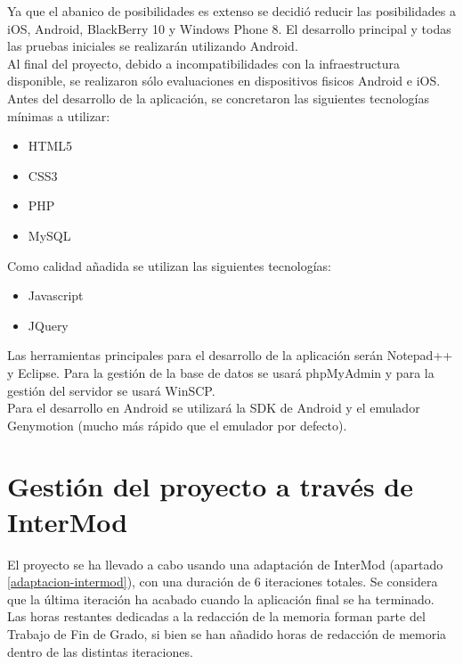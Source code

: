 Ya que el abanico de posibilidades es extenso se decidió reducir las posibilidades a iOS, Android, BlackBerry 10 y Windows Phone 8. El desarrollo principal y todas las pruebas iniciales se realizarán utilizando Android.\\

Al final del proyecto, debido a incompatibilidades con la infraestructura disponible, se realizaron sólo evaluaciones en dispositivos fisicos Android e iOS.\\

Antes del desarrollo de la aplicación, se concretaron las siguientes tecnologías mínimas a utilizar:

\begin{itemize}
\item HTML5
\item CSS3
\item PHP
\item MySQL
\end{itemize}

Como calidad añadida se utilizan las siguientes tecnologías:

\begin{itemize}
\item Javascript
\item JQuery
\end{itemize}

Las herramientas principales para el desarrollo de la aplicación serán Notepad++ y Eclipse. Para la gestión de la base de datos se usará phpMyAdmin y para la gestión del servidor se usará WinSCP.\\

Para el desarrollo en Android se utilizará la SDK de Android y el emulador Genymotion (mucho más rápido que el emulador por defecto).\\


\section{Gestión del proyecto a través de InterMod}
\label{gestion-via-intermod}

El proyecto se ha llevado a cabo usando una adaptación de InterMod (apartado \ref{adaptacion-intermod}), con una duración de 6 iteraciones totales. Se considera que la última iteración ha acabado cuando la aplicación final se ha terminado. Las horas restantes dedicadas a la redacción de la memoria forman parte del Trabajo de Fin de Grado, si bien se han añadido horas de redacción de memoria dentro de las distintas iteraciones.\\

